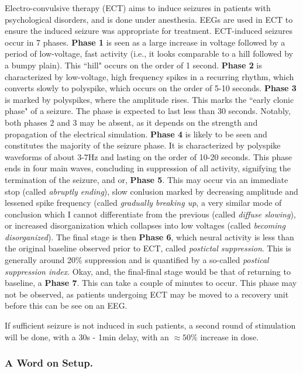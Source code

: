 Electro-convulsive therapy (ECT) aims to induce seizures in patients with psychological disorders, and is done under anesthesia. EEGs are used in ECT to ensure the induced seizure was appropriate for treatment. ECT-induced seizures occur in 7 phases. \textbf{Phase 1} is seen as a large increase in voltage followed by a period of low-voltage, fast activity (i.e., it looks comparable to a hill followed by a bumpy plain). This ``hill" occurs on the order of 1 second. \textbf{Phase 2} is characterized by low-voltage, high frequency spikes in a recurring rhythm, which converts slowly to polyspike, which occurs on the order of 5-10 seconds. \textbf{Phase 3} is marked by polyspikes, where the amplitude rises. This marks the ``early clonic phase" of a seizure. The phase is expected to last less than 30 seconds. Notably, both phases 2 and 3 may be absent, as it depends on the strength and propagation of the electrical simulation. \textbf{Phase 4} is likely to be seen and constitutes the majority of the seizure phase. It is characterized by polyspike waveforms of about 3-7Hz and lasting on the order of 10-20 seconds. This phase ends in four main waves, concluding in suppression of all activity, signifying the termination of the seizure, and or, \textbf{Phase 5}. This may occur via an immediate stop (called \textit{abruptly ending}), slow conlusion marked by decreasing amplitude and lessened spike frequency (called \textit{gradually breaking up}, a very similar mode of conclusion which I cannot differentiate from the previous (called \textit{diffuse slowing}), or increased disorganization which collapses into low voltages (called \textit{becoming disorganized}). The final stage is then \textbf{Phase 6}, which neural activity is less than the original baseline observed prior to ECT, called \textit{postictal suppression}. This is generally around 20\% suppression and is quantified by a so-called \textit{postical suppression index}. Okay, and, the final-final stage would be that of returning to baseline, a \textbf{Phase 7}. This can take a couple of minutes to occur. This phase may not be observed, as patients undergoing ECT may be moved to a recovery unit before this can be see on an EEG. \newline

If sufficient seizure is not induced in such patients, a second round of stimulation will be done, with a 30s - 1min delay, with an $\approx 50 \%$ increase in dose. 

\subsubsection{A Word on Setup.}

